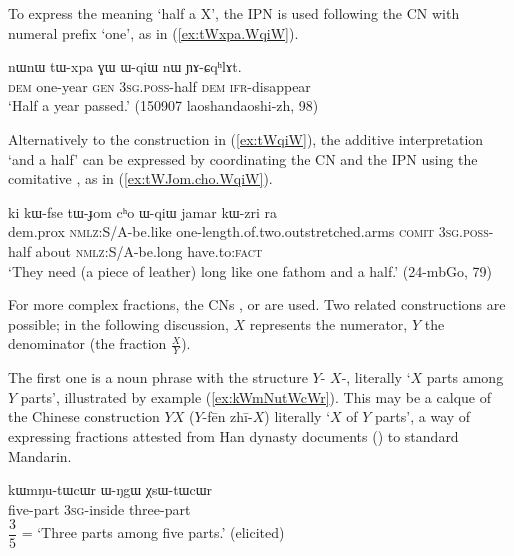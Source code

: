 {To express the meaning `half a X', the IPN  is used following the CN with numeral prefix `one', as in (\ref{ex:tWxpa.WqiW}).

\begin{exe}
\ex \label{ex:tWxpa.WqiW}
 \gll nɯnɯ tɯ-xpa ɣɯ ɯ-qiɯ nɯ ɲɤ-ɕqʰlɤt. \\
\textsc{dem} one-year \textsc{gen} \textsc{3sg}.\textsc{poss}-half \textsc{dem} \textsc{ifr}-disappear \\
\glt  `Half a year passed.' (150907 laoshandaoshi-zh, 98)
\end{exe}

Alternatively to the construction in (\ref{ex:tWqiW}), the additive interpretation  `and a half' can be expressed by coordinating the CN and the IPN  using the comitative , as in (\ref{ex:tWJom.cho.WqiW}).

\begin{exe}
\ex \label{ex:tWJom.cho.WqiW}
 \gll ki kɯ-fse tɯ-ɟom cʰo ɯ-qiɯ jamar kɯ-zri ra \\
 dem.prox \textsc{nmlz}:S/A-be.like one-length.of.two.outstretched.arms \textsc{comit} \textsc{3sg}.\textsc{poss}-half about \textsc{nmlz}:S/A-be.long have.to:\textsc{fact} \\
\glt `They need (a piece of leather) long like one fathom and a half.' (24-mbGo, 79)
\end{exe}

For more complex fractions, the CNs ,  or  are used. Two related constructions are possible; in the following discussion, $X$ represents the numerator, $Y$ the denominator (the fraction $\frac{X}{Y}$). 

The first one is a noun phrase with the structure $Y$-  $X$-, literally `$X$ parts among $Y$ parts', illustrated by example (\ref{ex:kWmNutWcWr}). This may be a calque of the Chinese construction $Y$$X$ 
($Y$-fēn zhī-$X$) literally `$X$ of $Y$ parts', a way of expressing fractions attested from Han dynasty documents (\citealt{anicotte15fractions}) to standard Mandarin.
 
\begin{exe}
\ex \label{ex:kWmNutWcWr}
 \gll kɯmŋu-tɯcɯr ɯ-ŋgɯ χsɯ-tɯcɯr  \\
 five-part \textsc{3sg}-inside three-part \\
 \glt $\dfrac{3}{5}$ = `Three parts among five parts.' (elicited)
\end{exe}

}

